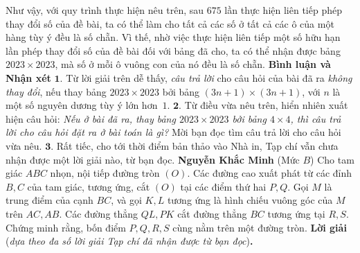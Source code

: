 \begin{multicols}{2}
	\vskip 0.05cm
	Như vậy, với quy trình thực hiện nêu trên, sau $675$ lần thực hiện liên tiếp phép thay đổi số của đề bài, ta có thể làm cho tất cả các số ở tất cả các ô của một hàng tùy ý đều là số chẵn. Vì thế, nhờ việc thực hiện liên tiếp một số hữu hạn lần phép thay đổi số của đề bài đối với bảng đã cho, ta có thể nhận được bảng $2023 \times 2023$, mà số ở mỗi ô vuông con của nó đều là số chẵn.
	\vskip 0.05cm
	\textbf{\color{thachthuctoanhoc}Bình luận và Nhận xét}
	\vskip 0.05cm
	$\pmb{1.}$ Từ lời giải trên dễ thấy, \textit{câu trả lời} cho câu hỏi của bài đã ra \textit{không thay đổi}, nếu thay bảng $2023 \!\!\times\!\! 2023$ bởi bảng $(3n \!+\!\! 1\!) \!\!\times\!\! (3n \!+\!\! 1\!)$, với $n$ là một số nguyên dương tùy ý lớn hơn~$1$.
	\vskip 0.05cm
	$\pmb{2.}$ Từ điều vừa nêu trên, hiển nhiên xuất hiện câu hỏi: \textit{Nếu ở bài đã ra, thay bảng \linebreak$2023 \times 2023$ bởi bảng $4 \times 4$, thì câu trả lời cho câu hỏi đặt ra ở bài toán là gì?} Mời bạn đọc tìm câu trả lời cho câu hỏi vừa nêu.
	\vskip 0.05cm
	$\pmb{3.}$ Rất tiếc, cho tới thời điểm bản thảo vào Nhà in, Tạp chí vẫn chưa nhận được một lời giải nào, từ bạn đọc.
	\vskip 0.05cm
	\hfill\textbf{\color{thachthuctoanhoc}Nguyễn Khắc Minh}
	\vskip 0.05cm
	{}
	(Mức $B$) Cho tam giác $ABC$ nhọn, nội tiếp đường tròn $(O)$. Các đường cao xuất phát từ các đỉnh $B,C$ của tam giác, tương ứng, cắt $(O)$ tại các điểm thứ hai $P,Q$. Gọi $M$ là trung điểm của cạnh $BC$, và gọi $K, L$ tương ứng là hình chiếu vuông góc của $M$ trên $AC, A B$. Các đường thẳng $Q L, P K$ cắt đường thẳng $B C$ tương ứng tại $R, S$. Chứng minh rằng, bốn điểm $P, Q, R, S$ cùng nằm trên một đường tròn.
	\vskip 0.05cm
	\textbf{\color{thachthuctoanhoc}Lời giải} (\textit{dựa theo đa số lời giải Tạp chí đã nhận được từ bạn đọc})\textbf{\color{thachthuctoanhoc}.}
	\begin{figure}[H]
		\centering
		\vspace*{-5pt}
		\captionsetup{labelformat= empty, justification=centering}

\end{figure}
\end{multicols}
